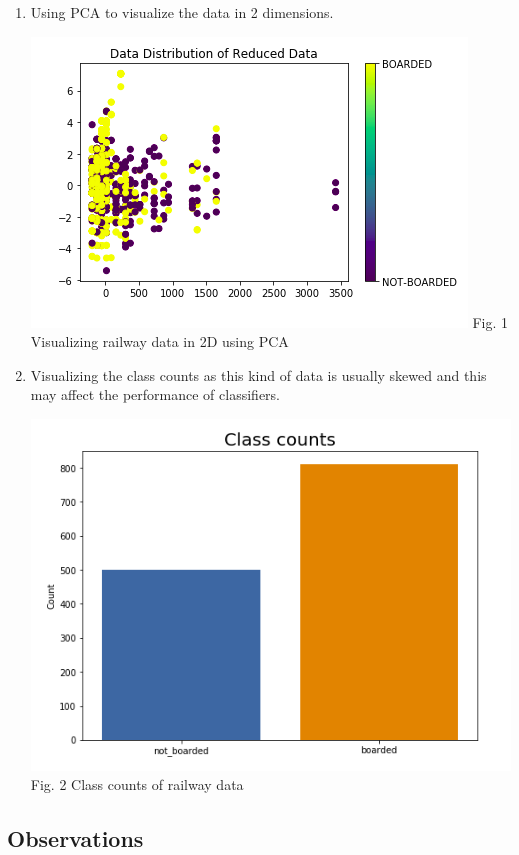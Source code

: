 \documentclass[12pt,journal,compsoc]{IEEEtran}
\begin{document}
\begin{enumerate}
\item Using PCA to visualize the data in 2 dimensions.
\begin{center}
\includegraphics[scale=0.50]{report/2d_data.png}
{\small 
Fig. 1 Visualizing railway data in 2D using PCA}
\end{center}
\item Visualizing the class counts as this kind of data is usually skewed and this may affect the performance of classifiers.

\begin{center}
\includegraphics[scale=0.40]{report/classcounts.png}
{\small 
Fig. 2 Class counts of railway data}
\end{center}
\end{enumerate}
\subsection{Observations}
\end{document}

